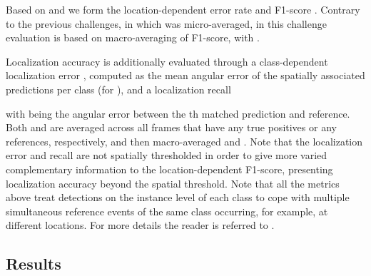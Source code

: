 \documentclass{article}
\begin{document}
\begin{sloppy}
Based on  and  we form the location-dependent error rate  and F1-score . Contrary to the previous challenges, in which  was micro-averaged, in this challenge evaluation is based on macro-averaging of F1-score, with .

Localization accuracy is additionally evaluated through a class-dependent localization error , computed as the mean angular error of the spatially associated predictions per class (for ), and a localization recall 

with  being the angular error between the th matched prediction and reference. Both  and  are averaged across all frames that have any true positives or any references, respectively, and then macro-averaged  and . Note that the localization error and recall are not spatially thresholded in order to give more varied complementary information to the location-dependent F1-score, presenting localization accuracy beyond the spatial threshold. Note that all the metrics above treat detections on the instance level of each class to cope with multiple simultaneous reference events of the same class occurring, for example, at different locations. For more details the reader is referred to \cite{politis2020overview}. 


\subsection{Results}
\label{sec:Results}


\end{sloppy}
\end{document}
